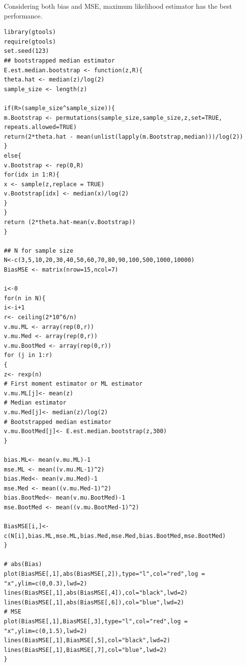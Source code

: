 \documentclass[conference,onecolumn]{IEEEtran}
\begin{document}
Considering both bias and MSE, maximum likelihood estimator has the best performance.


\begin{lstlisting}[caption={Monte Carlo experiment for comparing estimators of Exponential distribution},label={code:monte carlo}]
library(gtools)
require(gtools)
set.seed(123)
## bootstrapped median estimator
E.est.median.bootstrap <- function(z,R){
theta.hat <- median(z)/log(2)
sample_size <- length(z)

if(R>(sample_size^sample_size)){
m.Bootstrap <- permutations(sample_size,sample_size,z,set=TRUE, repeats.allowed=TRUE)
return(2*theta.hat - mean(unlist(lapply(m.Bootstrap,median)))/log(2))
}
else{
v.Bootstrap <- rep(0,R)
for(idx in 1:R){
x <- sample(z,replace = TRUE)
v.Bootstrap[idx] <- median(x)/log(2)
}
}
return (2*theta.hat-mean(v.Bootstrap))
}

## N for sample size
N<-c(3,5,10,20,30,40,50,60,70,80,90,100,500,1000,10000)
BiasMSE <- matrix(nrow=15,ncol=7)

i<-0
for(n in N){
i<-i+1
r<- ceiling(2*10^6/n)
v.mu.ML <- array(rep(0,r))
v.mu.Med <- array(rep(0,r))
v.mu.BootMed <- array(rep(0,r))
for (j in 1:r)
{
z<- rexp(n)
# First moment estimator or ML estimator
v.mu.ML[j]<- mean(z)
# Median estimator
v.mu.Med[j]<- median(z)/log(2)
# Bootstrapped median estimator
v.mu.BootMed[j]<- E.est.median.bootstrap(z,300)
}

bias.ML<- mean(v.mu.ML)-1
mse.ML <- mean((v.mu.ML-1)^2)
bias.Med<- mean(v.mu.Med)-1
mse.Med <- mean((v.mu.Med-1)^2)
bias.BootMed<- mean(v.mu.BootMed)-1
mse.BootMed <- mean((v.mu.BootMed-1)^2)

BiasMSE[i,]<-c(N[i],bias.ML,mse.ML,bias.Med,mse.Med,bias.BootMed,mse.BootMed)
}

# abs(Bias)
plot(BiasMSE[,1],abs(BiasMSE[,2]),type="l",col="red",log = "x",ylim=c(0,0.3),lwd=2)
lines(BiasMSE[,1],abs(BiasMSE[,4]),col="black",lwd=2)
lines(BiasMSE[,1],abs(BiasMSE[,6]),col="blue",lwd=2)
# MSE
plot(BiasMSE[,1],BiasMSE[,3],type="l",col="red",log = "x",ylim=c(0,1.5),lwd=2)
lines(BiasMSE[,1],BiasMSE[,5],col="black",lwd=2)
lines(BiasMSE[,1],BiasMSE[,7],col="blue",lwd=2)
}
\end{lstlisting}
\end{document}
